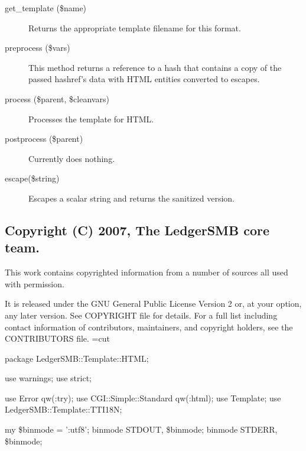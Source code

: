 \begin{description}
\begin{description}
\begin{description}
\begin{description}
\begin{description}
\begin{description}
\begin{description}
\begin{description}
\begin{description}
\begin{description}
\begin{description}
\item[{get\_template (\$name)}] \mbox{}

Returns the appropriate template filename for this format.


\item[{preprocess (\$vars)}] \mbox{}

This method returns a reference to a hash that contains a copy of the passed
hashref's data with HTML entities converted to escapes.


\item[{process (\$parent, \$cleanvars)}] \mbox{}

Processes the template for HTML.


\item[{postprocess (\$parent)}] \mbox{}

Currently does nothing.


\item[{escape(\$string)}] \mbox{}

Escapes a scalar string and returns the sanitized version.

\end{description}
\subsection*{Copyright (C) 2007, The LedgerSMB core team.\label{LedgerSMB::Template::HTML_Copyright_C_2007_The_LedgerSMB_core_team_}}


This work contains copyrighted information from a number of sources all used
with permission.



It is released under the GNU General Public License Version 2 or, at your 
option, any later version.  See COPYRIGHT file for details.  For a full list 
including contact information of contributors, maintainers, and copyright 
holders, see the CONTRIBUTORS file.
=cut



package LedgerSMB::Template::HTML;



use warnings;
use strict;



use Error qw(:try);
use CGI::Simple::Standard qw(:html);
use Template;
use LedgerSMB::Template::TTI18N;



my \$binmode = ':utf8';
binmode STDOUT, \$binmode;
binmode STDERR, \$binmode;




\end{description}
\end{description}
\end{description}
\end{description}
\end{description}
\end{description}
\end{description}
\end{description}
\end{description}
\end{description}

